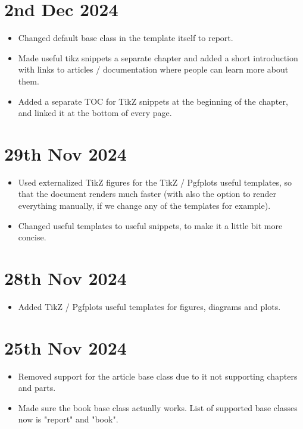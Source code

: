 \section*{2nd Dec 2024} \label{sec:changelog:2024/12/02}
\begin{itemize}
    \item Changed default base class in the template itself to report.
    \item Made useful tikz snippets a separate chapter and added a short introduction with links to articles / documentation where people can learn more about them.
    \item Added a separate TOC for TikZ snippets at the beginning of the chapter, and linked it at the bottom of every page.
\end{itemize}

\section*{29th Nov 2024} \label{sec:changelog:2024/11/29}
\begin{itemize}
    \item Used externalized TikZ figures for the TikZ / Pgfplots useful templates, so that the document renders much faster (with also the option to render everything manually, if we change any of the templates for example).
    \item Changed useful templates to useful snippets, to make it a little bit more concise.
\end{itemize}

\section*{28th Nov 2024} \label{sec:changelog:2024/11/28}
\begin{itemize}
    \item Added TikZ / Pgfplots useful templates for figures, diagrams and plots.
\end{itemize}

\section*{25th Nov 2024} \label{sec:changelog:2024/11/25}
\begin{itemize}
    \item Removed support for the article base class due to it not supporting chapters and parts.
    \item Made sure the book base class actually works. List of supported base classes now is "report" and "book".
\end{itemize}

